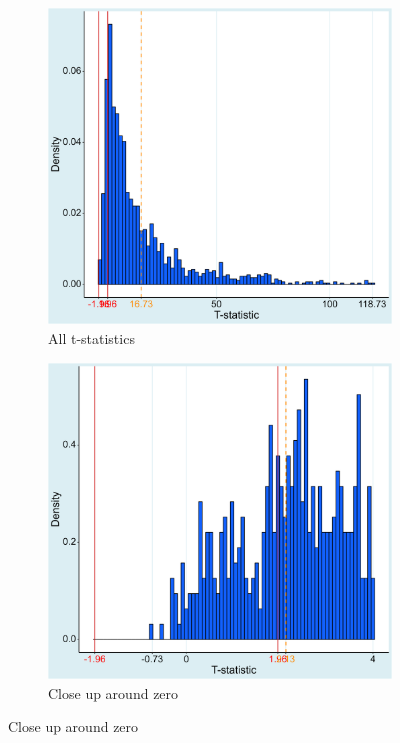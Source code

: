 \begin{figure}[!b]
\centering
\caption{The distribution of t-statistics is heavily skewed}
\label{fig:t_hist}
\begin{subfigure}[b]{0.45\textwidth}
  \caption{All t-statistics}
  \includegraphics[width=0.95\linewidth]{Figures/t_hist.png}
\end{subfigure}
\begin{subfigure}[b]{0.45\textwidth}
  \caption{Close up around zero}
  \includegraphics[width=0.95\linewidth]{Figures/t_hist_closeup.png}

\end{subfigure}
\end{figure}

